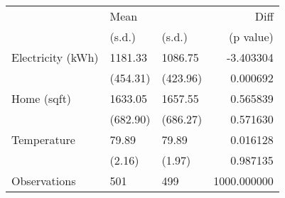 \begin{tabular}{lllr}
\toprule
{} & \multicolumn{2}{l}{Mean} &         Diff \\
{} &    (s.d.) &    (s.d.) &    (p value) \\
\midrule
Electricity (kWh) &   1181.33 &   1086.75 &    -3.403304 \\
                  &  (454.31) &  (423.96) &     0.000692 \\
Home (sqft)       &   1633.05 &   1657.55 &     0.565839 \\
                  &  (682.90) &  (686.27) &     0.571630 \\
Temperature       &     79.89 &     79.89 &     0.016128 \\
                  &    (2.16) &    (1.97) &     0.987135 \\
Observations      &       501 &       499 &  1000.000000 \\
\bottomrule
\end{tabular}
